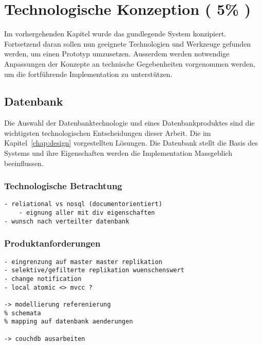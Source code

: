 \chapter{Technologische Konzeption ( 5\% )}


Im vorhergehenden Kapitel wurde das gundlegende System konzipiert.
Fortsetzend daran sollen nun geeignete Technologien und Werkzeuge gefunden werden,
um einen Prototyp umzusetzen.
Ausserdem werden notwendige Anpassungen der Konzepte an technische Gegebenheiten vorgenommen werden,
um die fortf\"uhrende Implementation zu unterst\"utzen.





\section{Datenbank}

Die Auswahl der Datenbanktechnologie und eines Datenbankproduktes sind die wichtigsten technologischen Entscheidungen dieser Arbeit.
Die im Kapitel~\ref{chap:design} vorgestellten L\"osungen.
Die Datenbank stellt die Basis des Systems und ihre Eigenschaften werden die Implementation Massgeblich beeinflussen.


\subsection{Technologische Betrachtung}


\begin{verbatim}
- reliational vs nosql (documentorientiert)
    - eignung aller mit div eigenschaften
- wunsch nach verteilter datenbank
\end{verbatim}

\subsection{Produktanforderungen}

\begin{verbatim}
- eingrenzung auf master master replikation
- selektive/gefilterte replikation wuenschenswert
- change notification
- local atomic <> mvcc ?

-> modellierung referenierung
% schemata
% mapping auf datenbank aenderungen

-> couchdb ausarbeiten

\end{verbatim}


